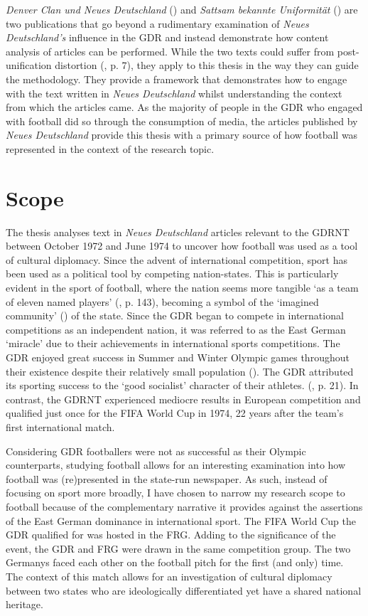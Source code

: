 \textit{Denver Clan und Neues Deutschland} (\cite{meyen2003}) and \textit{Sattsam bekannte Uniformität} (\cite{meyenschweiger2008}) are two publications that go beyond a rudimentary examination of \textit{Neues Deutschland’s} influence in the GDR and instead demonstrate how content analysis of articles can be performed. While the two texts could suffer from post-unification distortion (\cite{fullbrook1995}, p. 7), they apply to this thesis in the way they can guide the methodology. They provide a framework that demonstrates how to engage with the text written in \textit{Neues Deutschland} whilst understanding the context from which the articles came. As the majority of people in the GDR who engaged with football did so through the consumption of media, the articles published by \textit{Neues Deutschland} provide this thesis with a primary source of how football was represented in the context of the research topic.

\section*{Scope}

The thesis analyses text in \textit{Neues Deutschland} articles relevant to the GDRNT between October 1972 and June 1974 to uncover how football was used as a tool of cultural diplomacy. Since the advent of international competition, sport has been used as a political tool by competing nation-states. This is particularly evident in the sport of football, where the nation seems more tangible ‘as a team of eleven named players’ (\cite{hobsawm2012}, p. 143), becoming a symbol of the ‘imagined community’ (\cite{anderson1983}) of the state. Since the GDR began to compete in international competitions as an independent nation, it was referred to as the East German ‘miracle’ due to their achievements in international sports competitions. The GDR enjoyed great success in Summer and Winter Olympic games throughout their existence despite their relatively small population (\cite{dennisgrix2012}). The GDR attributed its sporting success to the ‘good socialist’ character of their athletes. (\cite{dennisgrix2012}, p. 21). In contrast, the GDRNT experienced mediocre results in European competition and qualified just once for the FIFA World Cup in 1974, 22 years after the team’s first international match.

Considering GDR footballers were not as successful as their Olympic counterparts, studying football allows for an interesting examination into how football was (re)presented in the state-run newspaper. As such, instead of focusing on sport more broadly, I have chosen to narrow my research scope to football because of the complementary narrative it provides against the assertions of the East German dominance in international sport. The FIFA World Cup the GDR qualified for was hosted in the FRG. Adding to the significance of the event, the GDR and FRG were drawn in the same competition group. The two Germanys faced each other on the football pitch for the first (and only) time. The context of this match allows for an investigation of cultural diplomacy between two states who are ideologically differentiated yet have a shared national heritage.

